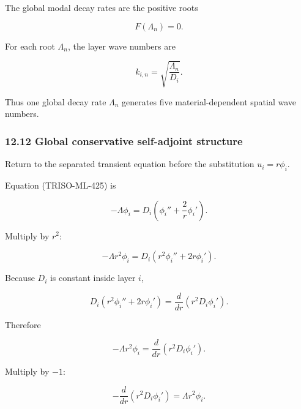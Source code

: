 \documentclass[11pt,a4paper]{article}
\begin{document}
The global modal decay rates are the positive roots

\begin{equation}
F(\Lambda_n)=0.
\tag{TRISO-ML-476}
\label{eq:triso-ml-476}
\end{equation}

For each root $\Lambda_n$, the layer wave numbers are

\begin{equation}
\boxed{
k_{i,n}
=
\sqrt{\frac{\Lambda_n}{D_i}}.
}
\tag{TRISO-ML-477}
\label{eq:triso-ml-477}
\end{equation}

Thus one global decay rate $\Lambda_n$ generates five material-dependent spatial wave numbers.

\subsubsection*{12.12 Global conservative self-adjoint structure}

Return to the separated transient equation before the substitution $u_i=r\phi_i$.

Equation (TRISO-ML-425) is

\begin{equation}
-\Lambda\phi_i
=
D_i
\left(
\phi_i''
+
\frac2r\phi_i'
\right).
\tag{TRISO-ML-478}
\label{eq:triso-ml-478}
\end{equation}

Multiply by $r^2$:

\begin{equation}
-\Lambda r^2\phi_i
=
D_i
\left(
r^2\phi_i''
+
2r\phi_i'
\right).
\tag{TRISO-ML-479}
\label{eq:triso-ml-479}
\end{equation}

Because $D_i$ is constant inside layer $i$,

\begin{equation}
D_i
\left(
r^2\phi_i''
+
2r\phi_i'
\right)
=
\frac{d}{dr}
\left(
r^2D_i\phi_i'
\right).
\tag{TRISO-ML-480}
\label{eq:triso-ml-480}
\end{equation}

Therefore

\begin{equation}
-\Lambda r^2\phi_i
=
\frac{d}{dr}
\left(
r^2D_i\phi_i'
\right).
\tag{TRISO-ML-481}
\label{eq:triso-ml-481}
\end{equation}

Multiply by $-1$:

\begin{equation}
\boxed{
-\frac{d}{dr}
\left(
r^2D_i\phi_i'
\right)
=
\Lambda r^2\phi_i.
}
\tag{TRISO-ML-482}
\label{eq:triso-ml-482}
\end{equation}
\end{document}
